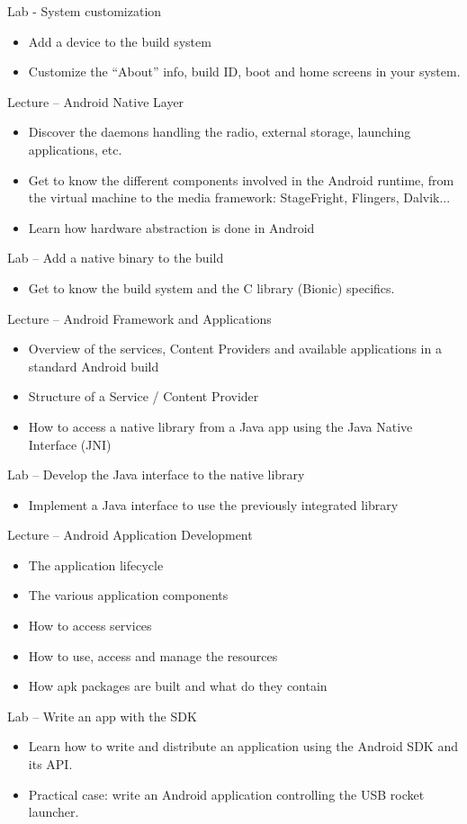 \documentclass[a4paper,12pt,obeyspaces,spaces,hyphens]{article}
\begin{document}
\feagendaonecolumn
{Lab - System customization}
{
  \begin{itemize}
  \item Add a device to the build system
  \item Customize the “About” info, build ID, boot and home screens in
    your system.
  \end{itemize}
}

\feagendatwocolumn
{Lecture – Android Native Layer}
{
  \begin{itemize}
  \item Discover the daemons handling the radio, external storage,
    launching applications, etc.
  \item Get to know the different components involved in the Android
    runtime, from the virtual machine to the media framework:
    StageFright, Flingers, Dalvik...
  \item Learn how hardware abstraction is done in Android
  \end{itemize}
}
{Lab – Add a native binary to the build}
{
  \begin{itemize}
  \item Get to know the build system and the C library (Bionic)
    specifics.
  \end{itemize}
}

\feagendatwocolumn
{Lecture – Android Framework and Applications}
{
  \begin{itemize}
  \item Overview of the services, Content Providers and available
    applications in a standard Android build
  \item Structure of a Service / Content Provider
  \item How to access a native library from a Java app
    using the Java Native Interface (JNI)
  \end{itemize}
}
{Lab – Develop the Java interface to the native library}
{
  \begin{itemize}
  \item Implement a Java interface to use the previously integrated
    library
  \end{itemize}
}

\feagendatwocolumn
{Lecture – Android Application Development}
{
  \begin{itemize}
  \item The application lifecycle
  \item The various application components
  \item How to access services
  \item How to use, access and manage the resources
  \item How apk packages are built and what do they contain
  \end{itemize}
}
{Lab – Write an app with the SDK}
{
  \begin{itemize}
  \item Learn how to write and distribute an application using the
    Android SDK and its API.
  \item Practical case: write an Android application controlling the
    USB rocket launcher.
  \end{itemize}
}
\end{document}
